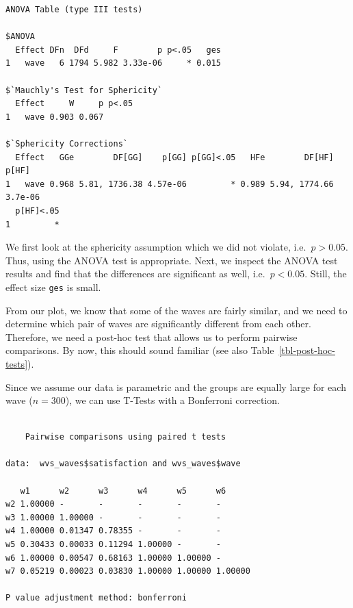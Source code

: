 \documentclass[
  letterpaper,
]{krantz}
\makeatletter
\newenvironment{Shaded}{\begin{snugshade}}{\end{snugshade}}
\newcommand{\AttributeTok}[1]{\textcolor[rgb]{0.40,0.45,0.13}{#1}}
\newcommand{\ConstantTok}[1]{\textcolor[rgb]{0.56,0.35,0.01}{#1}}
\newcommand{\FunctionTok}[1]{\textcolor[rgb]{0.28,0.35,0.67}{#1}}
\newcommand{\NormalTok}[1]{\textcolor[rgb]{0.00,0.23,0.31}{#1}}
\newcommand{\SpecialCharTok}[1]{\textcolor[rgb]{0.37,0.37,0.37}{#1}}
\newcommand{\StringTok}[1]{\textcolor[rgb]{0.13,0.47,0.30}{#1}}
\newenvironment{kframe}{%
\medskip{}
\setlength{\fboxsep}{.8em}
 \def\at@end@of@kframe{}%
 \ifinner\ifhmode%
  \def\at@end@of@kframe{\end{minipage}}%
  \begin{minipage}{\columnwidth}%
 \fi\fi%
 \def\FrameCommand##1{\hskip\@totalleftmargin \hskip-\fboxsep
 \colorbox{shadecolor}{##1}\hskip-\fboxsep
     \hskip-\linewidth \hskip-\@totalleftmargin \hskip\columnwidth}%
 \MakeFramed {\advance\hsize-\width
   \@totalleftmargin\z@ \linewidth\hsize
   \@setminipage}}%
 {\par\unskip\endMakeFramed%
 \at@end@of@kframe}
\renewenvironment{Shaded}{\begin{kframe}}{\end{kframe}}
\makeatother
\begin{document}
\begin{verbatim}
ANOVA Table (type III tests)

$ANOVA
  Effect DFn  DFd     F        p p<.05   ges
1   wave   6 1794 5.982 3.33e-06     * 0.015

$`Mauchly's Test for Sphericity`
  Effect     W     p p<.05
1   wave 0.903 0.067      

$`Sphericity Corrections`
  Effect   GGe        DF[GG]    p[GG] p[GG]<.05   HFe        DF[HF]   p[HF]
1   wave 0.968 5.81, 1736.38 4.57e-06         * 0.989 5.94, 1774.66 3.7e-06
  p[HF]<.05
1         *
\end{verbatim}

We first look at the sphericity assumption which we did not violate,
i.e.~\(p > 0.05\). Thus, using the ANOVA test is appropriate. Next, we
inspect the ANOVA test results and find that the differences are
significant as well, i.e.~\(p < 0.05\). Still, the effect size
\texttt{ges} is small.

From our plot, we know that some of the waves are fairly similar, and we
need to determine which pair of waves are significantly different from
each other. Therefore, we need a post-hoc test that allows us to perform
pairwise comparisons. By now, this should sound familiar (see also
Table~\ref{tbl-post-hoc-tests}).

Since we assume our data is parametric and the groups are equally large
for each wave (\(n = 300\)), we can use T-Tests with a Bonferroni
correction.

\begin{Shaded}
\end{Shaded}

\begin{verbatim}

    Pairwise comparisons using paired t tests 

data:  wvs_waves$satisfaction and wvs_waves$wave 

   w1      w2      w3      w4      w5      w6     
w2 1.00000 -       -       -       -       -      
w3 1.00000 1.00000 -       -       -       -      
w4 1.00000 0.01347 0.78355 -       -       -      
w5 0.30433 0.00033 0.11294 1.00000 -       -      
w6 1.00000 0.00547 0.68163 1.00000 1.00000 -      
w7 0.05219 0.00023 0.03830 1.00000 1.00000 1.00000

P value adjustment method: bonferroni 
\end{verbatim}
\end{document}
